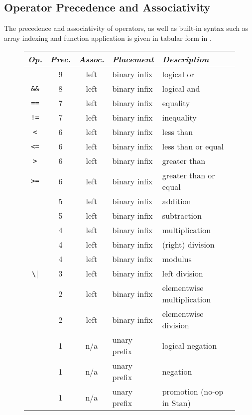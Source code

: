 \subsection{Operator Precedence and Associativity}

The precedence and associativity of operators, as well as built-in
syntax such as array indexing and function application is given in
tabular form in .
%
\begin{figure}
\begin{center}
\begin{tabular}{c|ccl|l}
{\it Op.} & {\it Prec.} & {\it Assoc.} & {\it
  Placement} & {\it Description}
\\ \hline \hline
\code{||} & 9 & left & binary infix & logical or
\\ \hline
\Verb|&&| & 8 & left & binary infix & logical and
\\ \hline
\Verb|==| & 7 & left & binary infix & equality
\\
\Verb|!=| & 7 & left & binary infix & inequality
\\ \hline
\Verb|<| & 6 & left & binary infix & less than
\\
\Verb|<=| & 6 & left & binary infix & less than or equal
\\
\Verb|>| & 6 & left & binary infix & greater than
\\
\Verb|>=| & 6 & left & binary infix & greater than or equal
\\ \hline
\code{+} & 5 & left & binary infix & addition
\\
\code{-} & 5 & left & binary infix & subtraction
\\ \hline
\code{*} & 4 & left & binary infix & multiplication
\\
\code{/} & 4 & left & binary infix & (right) division
\\
\code{\%} & 4 & left & binary infix & modulus
\\ \hline
\Verb|\| & 3 & left & binary infix & left division
\\ \hline
\code{.*} & 2 & left & binary infix & elementwise multiplication
\\
\code{./} & 2 & left & binary infix & elementwise division
\\ \hline
\code{!} & 1 & n/a & unary prefix & logical negation
\\
\code{-} & 1 & n/a & unary prefix & negation
\\
\code{+} & 1 & n/a & unary prefix & promotion (no-op in Stan)
\\ \hline

\end{tabular}
\end{center}
\end{figure}
